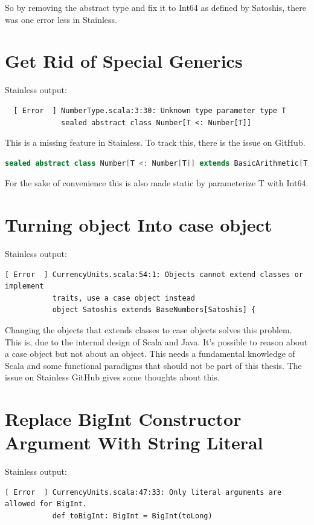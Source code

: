 So by removing the abstract type and fix it to Int64 as defined by Satoshis, there was one error less in Stainless.


\section{Get Rid of Special Generics}
Stainless output:
{\footnotesize\begin{verbatim}
  [ Error  ] NumberType.scala:3:30: Unknown type parameter type T
             sealed abstract class Number[T <: Number[T]]
\end{verbatim}}

This is a missing feature in Stainless.
To track this, there is the issue  on GitHub.
\begin{lstlisting}[language=scala]
  sealed abstract class Number[T <: Number[T]] extends BasicArithmetic[T]  
\end{lstlisting}
For the sake of convenience this is also made static by parameterize T with Int64.


\section{Turning object Into case object}
Stainless output:
{\footnotesize\begin{verbatim}
[ Error  ] CurrencyUnits.scala:54:1: Objects cannot extend classes or implement
           traits, use a case object instead
           object Satoshis extends BaseNumbers[Satoshis] {
\end{verbatim}}

Changing the objects that extends classes to case objects solves this problem.
This is, due to the internal design of Scala and Java.
It's possible to reason about a case object but not about an object.
This needs a fundamental knowledge of Scala and some functional paradigms that should not be part of this thesis.
The issue  on Stainless GitHub gives some thoughts about this.


\section{Replace BigInt Constructor Argument With String Literal}
Stainless output:
{\footnotesize\begin{verbatim}
[ Error  ] CurrencyUnits.scala:47:33: Only literal arguments are allowed for BigInt.
           def toBigInt: BigInt = BigInt(toLong)
\end{verbatim}}

